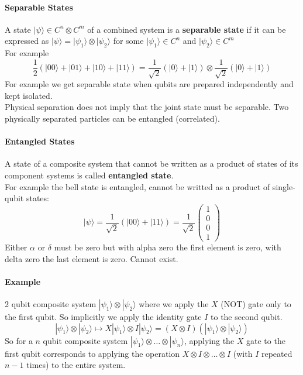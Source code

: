 \documentclass[10pt]{report}
\begin{document}
\paragraph{Separable States} A state $|\psi\rangle\in C^n\otimes C^m$ of a combined system is a \textbf{separable state} if it can be expressed as $|\psi\rangle = |\psi_1\rangle\otimes|\psi_2\rangle$ for some $|\psi_1\rangle\in C^n$ and $|\psi_2\rangle\in C^m$\\
For example $$\frac{1}{2}(|00\rangle+|01\rangle+|10\rangle+|11\rangle) = \frac{1}{\sqrt{2}}(|0\rangle + |1\rangle)\otimes \frac{1}{\sqrt{2}}(|0\rangle+|1\rangle)$$
For example we get separable state when qubits are prepared independently and kept isolated.\\
Physical separation does not imply that the joint state must be separable. Two physically separated particles can be entangled (correlated).
\paragraph{Entangled States} A state of a composite system that cannot be written as a product of states of its component systems is called \textbf{entangled state}.\\
For example the bell state is entangled, cannot be writted as a product of single-qubit states:
$$|\psi\rangle=\frac{1}{\sqrt{2}}(|00\rangle+|11\rangle) = \frac{1}{\sqrt{2}}\left(\begin{array}{c}
1\\0\\0\\1
\end{array}\right)$$
Either $\alpha$ or $\delta$ must be zero but with alpha zero the first element is zero, with delta zero the last element is zero. Cannot exist.
\paragraph{Example} 2 qubit composite system $|\psi_1\rangle\otimes|\psi_2\rangle$ where we apply the $X$ (NOT) gate only to the first qubit. So implicitly we apply the identity gate $I$ to the second qubit.
$$|\psi_1\rangle\otimes|\psi_2\rangle\mapsto X|\psi_1\rangle\otimes I|\psi_2\rangle = (X\otimes I)(|\psi_1\rangle\otimes|\psi_2\rangle)$$
So for a $n$ qubit composite system $|\psi_1\rangle\otimes\ldots\otimes|\psi_n\rangle$, applying the $X$ gate to the first qubit corresponds to applying the operation $X\otimes I\otimes\ldots\otimes I$ (with $I$ repeated $n-1$ times) to the entire system.
\end{document}
